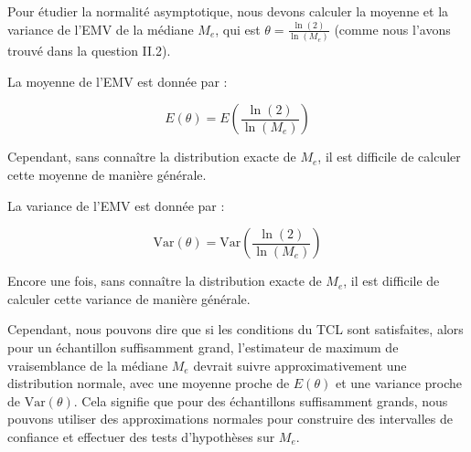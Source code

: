 \documentclass[11pt]{beamer}
\begin{document}
\begin{frame}
	Pour étudier la normalité asymptotique, nous devons calculer la moyenne et la variance de l'EMV de la médiane $M_e$, qui est $\theta = \frac{\ln(2)}{\ln(M_e)}$ (comme nous l'avons trouvé dans la question II.2).
	
	La moyenne de l'EMV est donnée par :
	
	\[ E(\theta) = E\left(\frac{\ln(2)}{\ln(M_e)}\right) \]
	
	Cependant, sans connaître la distribution exacte de $M_e$, il est difficile de calculer cette moyenne de manière générale.
	
	La variance de l'EMV est donnée par :
	
	\[ \text{Var}(\theta) = \text{Var}\left(\frac{\ln(2)}{\ln(M_e)}\right) \]	
\end{frame}
\begin{frame}
	Encore une fois, sans connaître la distribution exacte de $M_e$, il est difficile de calculer cette variance de manière générale.
	
	Cependant, nous pouvons dire que si les conditions du TCL sont satisfaites, alors pour un échantillon suffisamment grand, l'estimateur de maximum de vraisemblance de la médiane $M_e$ devrait suivre approximativement une distribution normale, avec une moyenne proche de $E(\theta)$ et une variance proche de $\text{Var}(\theta)$. Cela signifie que pour des échantillons suffisamment grands, nous pouvons utiliser des approximations normales pour construire des intervalles de confiance et effectuer des tests d'hypothèses sur $M_e$.
	
\end{frame}
\end{document}
